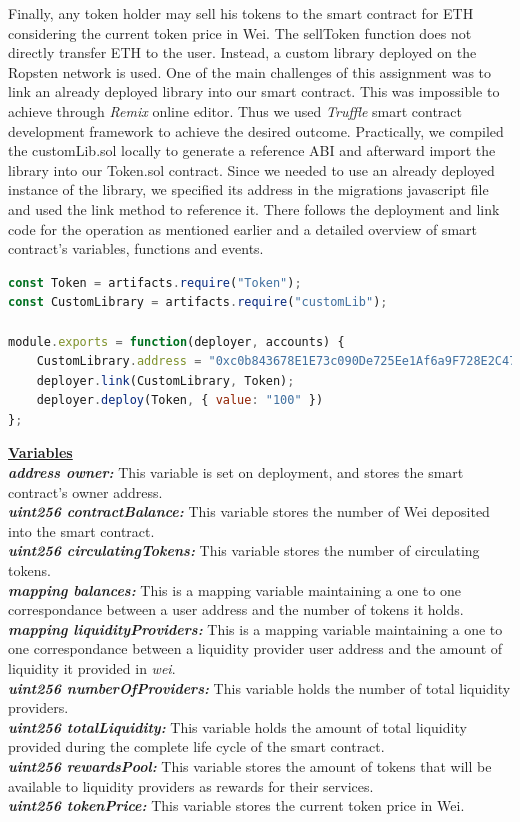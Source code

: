\documentclass[12pt,a4paper]{article}
\begin{document}
Finally, any token holder may sell his tokens to the smart contract for ETH
considering the current token price in Wei. The sellToken function does not
directly transfer ETH to the user. Instead, a custom library deployed on the
Ropsten network is used. One of the main challenges of this assignment was to
link an already deployed library into our smart contract. This was impossible to
achieve through \emph{Remix} online editor. Thus we used \emph{Truffle} smart contract
development framework to achieve the desired outcome. Practically, we compiled
the customLib.sol locally to generate a reference ABI and afterward import the
library into our Token.sol contract. Since we needed to use an already deployed
instance of the library, we specified its address in the migrations javascript
file and used the link method to reference it. There follows the deployment and
link code for the operation as mentioned earlier and a detailed overview of smart
contract's variables, functions and events. \\

\begin{lstlisting}[language=JavaScript]
const Token = artifacts.require("Token");
const CustomLibrary = artifacts.require("customLib");

module.exports = function(deployer, accounts) {
    CustomLibrary.address = "0xc0b843678E1E73c090De725Ee1Af6a9F728E2C47"
    deployer.link(CustomLibrary, Token);
    deployer.deploy(Token, { value: "100" })
};
\end{lstlisting}


\textbf{\underline{Variables}} \\
\textbf{\emph{address owner:}} This variable is set on deployment, and stores the smart
contract's owner address.\\
\textbf{\emph{uint256 contractBalance:}} This variable stores the number of Wei deposited
into the smart contract.\\
\textbf{\emph{uint256 circulatingTokens:}}  This variable stores the number of
circulating tokens.\\
\textbf{\emph{mapping balances:}} This is a mapping variable maintaining a one to one
correspondance between a user address and the number of tokens it holds. \\
\textbf{\emph{mapping liquidityProviders:}} This is a mapping variable maintaining a one
to one correspondance between a liquidity provider user address and the amount
of liquidity it provided in \emph{wei}. \\
\textbf{\emph{uint256 numberOfProviders:}} This variable holds the number of total
liquidity providers.\\
\textbf{\emph{uint256 totalLiquidity:}} This variable holds the amount of total liquidity
provided during the complete life cycle of the smart contract.\\
\textbf{\emph{uint256 rewardsPool:}} This variable stores the amount of tokens that will
be available to liquidity providers as rewards for their services.\\
\textbf{\emph{uint256 tokenPrice:}} This variable stores the current token price in Wei.\\
\end{document}
